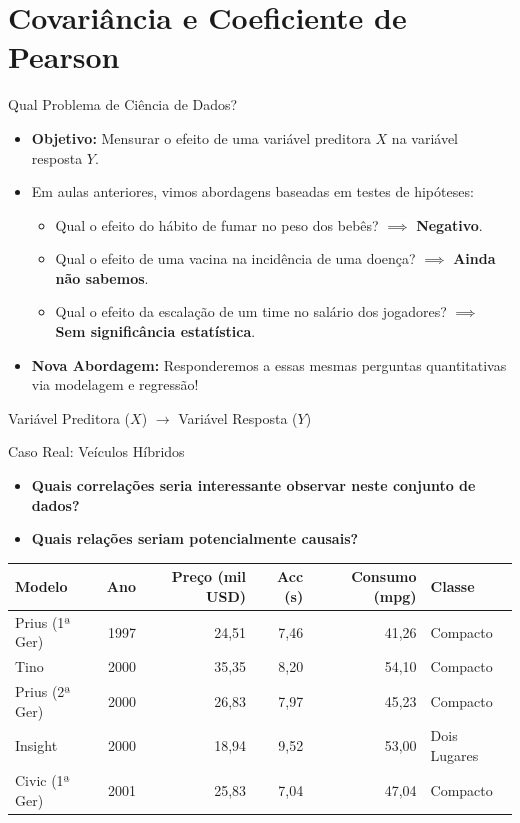 \section{Covariância e Coeficiente de Pearson}

\begin{frame}{Qual Problema de Ciência de Dados?}
    \begin{itemize}
        \item \textbf{Objetivo:} Mensurar o efeito de uma variável preditora $X$ na variável resposta $Y$.
        \item Em aulas anteriores, vimos abordagens baseadas em testes de hipóteses:
        \begin{itemize}
            \item Qual o efeito do hábito de fumar no peso dos bebês? $\implies$ \textbf{Negativo}.
            \item Qual o efeito de uma vacina na incidência de uma doença? $\implies$ \textbf{Ainda não sabemos}.
            \item Qual o efeito da escalação de um time no salário dos jogadores? $\implies$ \textbf{Sem significância estatística}.
        \end{itemize}
        \item \textbf{Nova Abordagem:} Responderemos a essas mesmas perguntas quantitativas via modelagem e regressão!
    \end{itemize}
    \vspace{0.4cm}
    \centering
    \Large{Variável Preditora ($X$) \quad $\longrightarrow$ \quad Variável Resposta ($Y$)}
\end{frame}

\begin{frame}{Caso Real: Veículos Híbridos}
    \begin{itemize}
        \item \textbf{Quais correlações seria interessante observar neste conjunto de dados?}
        \item \textbf{Quais relações seriam potencialmente causais?}
    \end{itemize}
    \vspace{0.2cm}
    \centering
    \footnotesize
    \begin{tabular}{lrrrrl}
    \toprule
    Modelo & Ano & Preço (mil USD) & Acc (s) & Consumo (mpg) & Classe \\
    \midrule
    Prius (1ª Ger) & 1997 & 24,51 & 7,46 & 41,26 & Compacto \\
    Tino & 2000 & 35,35 & 8,20 & 54,10 & Compacto \\
    Prius (2ª Ger) & 2000 & 26,83 & 7,97 & 45,23 & Compacto \\
    Insight & 2000 & 18,94 & 9,52 & 53,00 & Dois Lugares \\
    Civic (1ª Ger) & 2001 & 25,83 & 7,04 & 47,04 & Compacto \\
    \bottomrule
    \end{tabular}
\end{frame}

